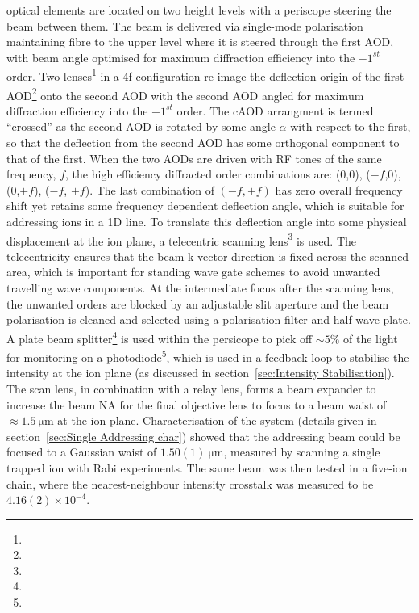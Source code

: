     optical elements are located on two height levels with a periscope steering
    the beam between them. The beam is delivered via single-mode polarisation
    maintaining fibre to the upper level where it is steered through the first
    AOD, with beam angle optimised for maximum diffraction efficiency into the
    $-1^{st}$ order. Two lenses\footnote{} in a 4f configuration
    re-image the deflection origin of the first AOD\footnote{} onto
    the second AOD with the second AOD angled for maximum diffraction efficiency
    into the $+1^{st}$ order. The cAOD arrangment is termed ``crossed'' as the
    second AOD is rotated by some angle $\alpha$ with respect to the first, so
    that the deflection from the second AOD has some orthogonal component to
    that of the first. When the two AODs are driven with RF tones of the same
    frequency, $f$, the high efficiency diffracted order combinations are:
    (0,0), ($-f$,0), (0,$+f$), ($-f$, $+f$). The last combination of $(-f, +f)$
    has zero overall frequency shift yet retains some frequency dependent
    deflection angle, which is suitable for addressing ions in a 1D line. To
    translate this deflection angle into some physical displacement at the ion
    plane, a telecentric scanning lens\footnote{} is used. The
    telecentricity ensures that the beam k-vector direction is fixed across the
    scanned area, which is important for standing wave gate schemes to avoid
    unwanted travelling wave components. At the intermediate focus after the
    scanning lens, the unwanted orders are blocked by an adjustable slit
    aperture and the beam polarisation is cleaned and selected using a
    polarisation filter and half-wave plate. A plate beam
    splitter\footnote{} is used within the persicope to pick off $\sim
    5\%$ of the light for monitoring on a photodiode\footnote{}, which
    is used in a feedback loop to stabilise the intensity at the ion plane (as
    discussed in section~\ref{sec:Intensity Stabilisation}). The scan lens, in
    combination with a relay lens, forms a beam expander to increase the beam NA
    for the final objective lens to focus to a beam waist of $\approx
    1.5~\unit{\micro\meter}$ at the ion plane.
    Characterisation of the system (details given in section~\ref{sec:Single Addressing char}) showed that the addressing beam could be focused to a Gaussian waist of $1.50(1)~\unit{\micro\meter}$, measured by scanning a single trapped ion with Rabi experiments. The same beam was then tested in a five-ion chain, where the nearest-neighbour intensity crosstalk was measured to be $4.16(2)\times 10^{-4}$. 

